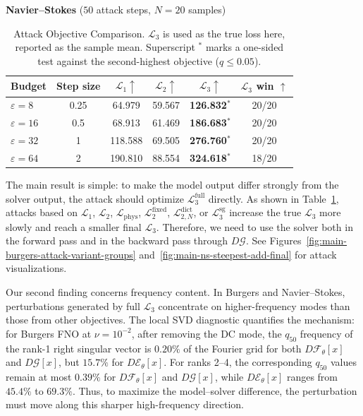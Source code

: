 ﻿\documentclass[letterpaper]{article} %
\newcommand{\tabref}[1]{Table~\ref{#1}}
\begin{document}
\begin{table}[t]
\vspace{0.1em}
\setlength{\tabcolsep}{1.1pt}
\textbf{Navier--Stokes} (\(50\) attack steps, \(N=20\) samples)\\[0.15em]
\begin{tabular}{@{}lccccc@{}}
\toprule
Budget & Step size & \(\mathcal L_1 \uparrow\) & \(\mathcal L_2 \uparrow\) &
\(\boldsymbol{\mathcal L}_3 \uparrow\) & \(\mathcal L_3\) win \(\uparrow\) \\
\midrule
\(\varepsilon=8\) & 0.25 & 64.979 & 59.567 & \textbf{126.832}\(^{*}\) & 20/20 \\
\(\varepsilon=16\) & 0.5 & 68.913 & 61.469 & \textbf{186.683}\(^{*}\) & 20/20 \\
\(\varepsilon=32\) & 1 & 118.588 & 69.505 & \textbf{276.760}\(^{*}\) & 20/20 \\
\(\varepsilon=64\) & 2 & 190.810 & 88.554 & \textbf{324.618}\(^{*}\) & 18/20 \\
\bottomrule
\end{tabular}
\caption{Attack Objective Comparison. \(\mathcal L_3\) is used as the
true loss here, reported as the sample mean. Superscript \(^{*}\) marks a
one-sided test against the second-highest objective (\(q\le 0.05\)).}
\label{tab:attack_objective_true_l3_summary}
\end{table}

The main result is simple: to make the model output differ strongly from the
solver output, the attack should optimize $\mathcal{L}^{\mathrm{full}}_3$
directly. As shown in \tabref{tab:attack_objective_true_l3_summary}, attacks based on
$\mathcal{L}_1$, $\mathcal{L}_2$, $\mathcal{L}_{\mathrm{phys}}$,
$\mathcal{L}^{\mathrm{fixed}}_2$, $\mathcal{L}^{\mathrm{dict}}_{2,N}$, or
$\mathcal{L}^{\mathrm{sg}}_3$ increase the true $\mathcal{L}_3$ more
slowly and reach a smaller final $\mathcal{L}_3$. Therefore, we need to use the
solver both in the forward pass and in the backward pass through
$D\mathcal{G}$. See Figures~\ref{fig:main-burgers-attack-variant-groups}
and~\ref{fig:main-ns-steepest-add-final} for attack visualizations.

Our second finding concerns frequency content. In Burgers and Navier--Stokes,
perturbations generated by full $\mathcal{L}_3$ concentrate on higher-frequency
modes than those from other objectives. The local SVD diagnostic quantifies the
mechanism: for Burgers FNO at \(\nu=10^{-2}\), after removing the DC mode, the
\(q_{50}\) frequency of the rank-1 right singular vector is \(0.20\%\) of the
Fourier grid for both \(D\mathcal{F}_\theta[x]\) and \(D\mathcal{G}[x]\), but
\(15.7\%\) for \(D\mathcal{E}_\theta[x]\). For ranks 2--4, the corresponding
\(q_{50}\) values remain at most \(0.39\%\) for \(D\mathcal{F}_\theta[x]\) and
\(D\mathcal{G}[x]\), while \(D\mathcal{E}_\theta[x]\) ranges from \(45.4\%\) to
\(69.3\%\).
Thus, to maximize the model--solver difference, the perturbation must move
along this sharper high-frequency direction.
\end{document}
